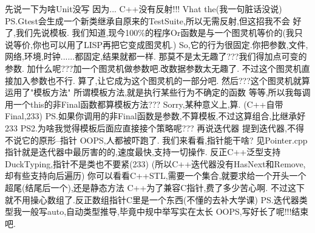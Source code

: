 \documentclass{ctexart}
\def\enter{{\hfill\break}}
\begin{document}
\enter
先说一下为啥Unit没写\enter
因为...\enter
C++没有反射!!!\enter
Vhat the(我一句脏话没说)\enter
PS.Gtest会生成一个新类继承自原来的TestSuite,所以无需反射,但这招我不会\enter
\enter
好了,我们先说模板.\enter
我们知道,现今{100\%}的程序Or函数是与一个图灵机等价的(我只说等价,你也可以用了LISP再把它变成图灵机.)\enter
So,它的行为很固定.你把参数,文件,网络,环境,时钟......都固定,结果就都一样.\enter
那莫不是太无趣了???我们得加点可变的参数.\enter
加什么呢???加一个图灵机做参数吧.改数据参数太无趣了.\enter
不过这个图灵机直接加入参数也不行.\enter
算了,让它成为这个图灵机的一部分吧.\enter
然后???这个图灵机就算运用了"模板方法"\enter
所谓模板方法,就是执行某些行为不确定的函数\enter
等等,所以我每调用一个this的非Final函数都算模板方法???\enter
Sorry,某种意义上,算.\enter
(C++自带Final,233)\enter
\enter
PS.如果你调用的非Final函数是参数,不算模板,不过这算组合,比继承好233\enter
PS2.为啥我觉得模板后面应直接接个策略呢???\enter
\enter
再说迭代器
提到迭代器,不得不说它的原形--指针\enter
OOPS,人都被吓跑了.\enter
我们来看看,指针能干啥?\enter
见Pointer.cpp\enter
指针就是迭代器中最厉害的的,速度最快,支持一切操作.\enter
反正C++泛型支持DuckTyping,指针不是类也不要紧(233)\enter
(所以C++迭代器没有HasNext和Remove,却有些支持向后遍历)\enter
你可以看看C++STL,需要一个集合,就要求给一个开头一个超尾(结尾后一个),还是静态方法\enter
C++为了兼容C指针,费了多少苦心啊.\enter
不过这下就不用操心数组了.反正数组指针C里是一个东西(不懂的去补大学课)\enter
PS.迭代器类型我一般写auto,自动类型推导,毕竟中规中举写实在太长\enter
OOPS,写好长了呢!!!结束吧.\enter
\end{document}

